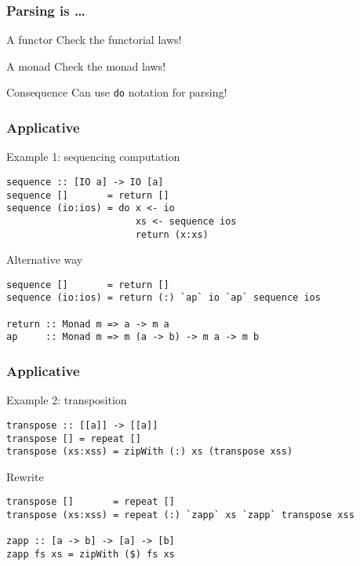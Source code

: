 \documentclass{beamer}
\begin{document}
\begin{frame}[fragile]
  \frametitle{Parsing is \dots}
  \begin{block}{A functor}
    Check the functorial laws!
  \end{block}
  \begin{block}{A monad}
    Check the monad laws!
  \end{block}
  \begin{alertblock}{Consequence}
    Can use \texttt{do} notation for parsing!
  \end{alertblock}
\end{frame}


\begin{frame}[fragile]
  \frametitle{Applicative}
  \begin{alertblock}{Example 1: sequencing computation}
\begin{verbatim}
sequence :: [IO a] -> IO [a]
sequence []       = return []
sequence (io:ios) = do x <- io
                       xs <- sequence ios
                       return (x:xs)
\end{verbatim}  
  \end{alertblock}
  \begin{alertblock}{Alternative way}
\begin{verbatim}
sequence []       = return []
sequence (io:ios) = return (:) `ap` io `ap` sequence ios

return :: Monad m => a -> m a
ap     :: Monad m => m (a -> b) -> m a -> m b
\end{verbatim}
  \end{alertblock}
\end{frame}



\begin{frame}[fragile]
 \frametitle{Applicative}
 \begin{exampleblock}{Example 2: transposition}
\begin{verbatim}
transpose :: [[a]] -> [[a]]
transpose [] = repeat []
transpose (xs:xss) = zipWith (:) xs (transpose xss)
\end{verbatim}
 \end{exampleblock}
 \begin{alertblock}{Rewrite}
\begin{verbatim}
transpose []       = repeat []
transpose (xs:xss) = repeat (:) `zapp` xs `zapp` transpose xss

zapp :: [a -> b] -> [a] -> [b]
zapp fs xs = zipWith ($) fs xs
\end{verbatim}
 \end{alertblock}
\end{frame}             
\end{document}

